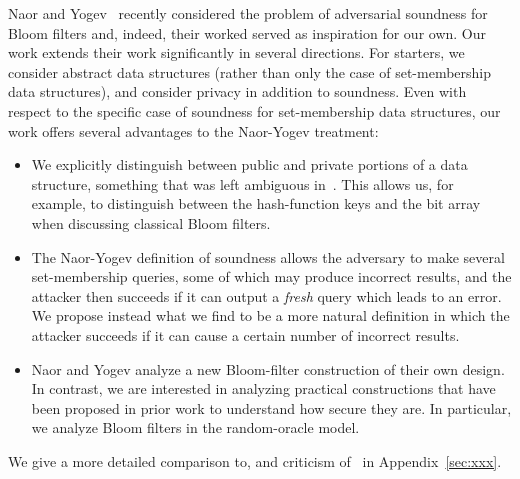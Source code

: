  Naor and
Yogev~\cite{naor2015bloom} recently considered the problem of
adversarial soundness for Bloom filters and, indeed,
their worked served as inspiration for our own. Our work extends
their work significantly in several directions. For starters, we
consider abstract data structures (rather than only the case of
set-membership data structures), and consider privacy in addition to
soundness. Even with respect to the specific case of soundness for
set-membership data structures, our work offers several advantages
to the Naor-Yogev treatment:
\begin{itemize}
\item We explicitly distinguish between public and private
    portions of a data structure, something that was left
    ambiguous in~\cite{naor2015bloom}. This allows us, for
    example, to distinguish between the hash-function keys and
    the bit array when discussing classical Bloom filters.
\item The Naor-Yogev definition of soundness allows the
    adversary to make several set-membership queries, some of
    which may produce incorrect results, and the attacker then
    succeeds if it can output a \emph{fresh} query which leads
    to an error. We propose instead what we find to be a more
    natural definition in which the attacker succeeds if it can
    cause a certain number of incorrect results.
\item Naor and Yogev analyze a new Bloom-filter construction of
    their own design. In contrast, we are interested in
    analyzing practical constructions that have been proposed in
    prior work to understand how secure they are. In particular,
    we analyze Bloom filters in the random-oracle model.
\end{itemize}
We give a more detailed comparison to, and criticism
of~\cite{naor2015bloom} in Appendix~\ref{sec:xxx}. 

